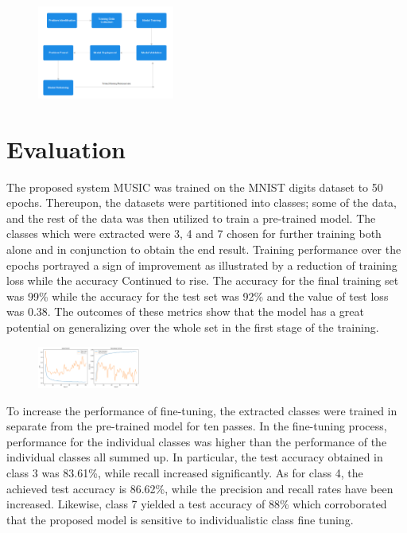 \documentclass[conference]{IEEEtran}
\begin{document}
\begin{figure}[h]
    \centering
    \includegraphics[width=0.4\textwidth, keepaspectratio]{fig1.png}
    
\end{figure}


\section{Evaluation}
The proposed system MUSIC was trained on the MNIST digits dataset to 50 epochs. Thereupon, the datasets were partitioned into classes; some of the data, and the rest of the data was then utilized to train a pre-trained model. The classes which were extracted were 3, 4 and 7 chosen for further training both alone and in conjunction to obtain the end result. Training performance over the epochs portrayed a sign of improvement as illustrated by a reduction of training loss while the accuracy Continued to rise.  The accuracy for the final training set was 99\% while the accuracy for the test set was 92\% and the value of test loss was 0.38. The outcomes of these metrics show that the model has a great potential on generalizing over the whole set in the first stage of the training.


\begin{figure}[h]
    \centering
    \includegraphics[width=0.3\textwidth, keepaspectratio]{predefined.png}
    
\end{figure}

To increase the performance of fine-tuning, the extracted classes were trained in separate from the pre-trained model for ten passes. In the fine-tuning process, performance for the individual classes was higher than the performance of the individual classes all summed up. In particular, the test accuracy obtained in class 3 was 83.61\%, while recall increased significantly. As for class 4, the achieved test accuracy is 86.62\%, while the precision and recall rates have been increased. Likewise, class 7 yielded a test accuracy of 88\% which corroborated that the proposed model is sensitive to individualistic class fine tuning. 
\end{document}
